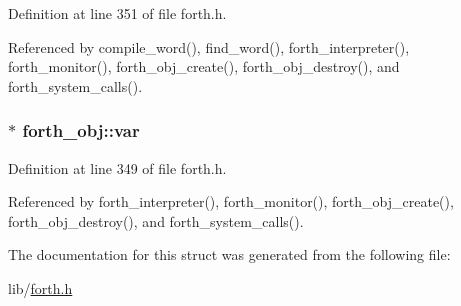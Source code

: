 Definition at line 351 of file forth.\-h.



Referenced by compile\-\_\-word(), find\-\_\-word(), forth\-\_\-interpreter(), forth\-\_\-monitor(), forth\-\_\-obj\-\_\-create(), forth\-\_\-obj\-\_\-destroy(), and forth\-\_\-system\-\_\-calls().

\hypertarget{structforth__obj_a7e44fb7a44a10b0acbfdce4c919db914}{
\subsubsection[{var}]{$\ast$ forth\-\_\-obj\-::var}}\label{structforth__obj_a7e44fb7a44a10b0acbfdce4c919db914}


Definition at line 349 of file forth.\-h.



Referenced by forth\-\_\-interpreter(), forth\-\_\-monitor(), forth\-\_\-obj\-\_\-create(), forth\-\_\-obj\-\_\-destroy(), and forth\-\_\-system\-\_\-calls().



The documentation for this struct was generated from the following file\-:\begin{DoxyCompactItemize}
\item 
lib/\hyperlink{forth_8h}{forth.\-h}\end{DoxyCompactItemize}
